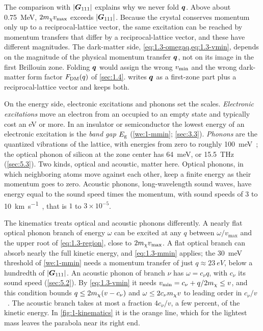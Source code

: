 The comparison with $|\bm{G}_{111}|$ explains why we never fold $\bm{q}$. Above about \SI{0.75}{MeV}, $2m_{\chi} v_{\mathrm{max}}$ exceeds $|\bm{G}_{111}|$. Because the crystal conserves momentum only up to a reciprocal-lattice vector, the same excitation can be reached by momentum transfers that differ by a reciprocal-lattice vector, and these have different magnitudes. The dark-matter side, \cref{eq:1.3-omegaq,eq:1.3-vmin}, depends on the magnitude of the physical momentum transfer $\bm{q}$, not on its image in the first Brillouin zone. Folding $\bm{q}$ would assign the wrong $v_{\mathrm{min}}$ and the wrong dark-matter form factor $F_{\mathrm{DM}}(q)$ of \cref{sec:1.4}.  writes $\bm{q}$ as a first-zone part plus a reciprocal-lattice vector and keeps both.

On the energy side, electronic excitations and phonons set the scales. \emph{Electronic excitations} move an electron from an occupied to an empty state and typically cost an eV or more. In an insulator or semiconductor the lowest energy of an electronic excitation is the \emph{band gap} $E_{\mathrm{g}}$ (\cref{we:1-mmin}; \cref{sec:3.3}). \emph{Phonons} are the quantized vibrations of the lattice, with energies from zero to roughly \SI{100}{meV}~\cite[Sect.~III\,A]{kahn2022searches}; the optical phonon of silicon at the zone center has \SI{64}{meV}, or \SI{15.5}{THz}~\cite{nilsson1972study} (\cref{sec:5.3}). Two kinds, optical and acoustic, matter here. Optical phonons, in which neighboring atoms move against each other, keep a finite energy as their momentum goes to zero. Acoustic phonons, long-wavelength sound waves, have energy equal to the sound speed times the momentum, with sound speeds of 3 to \SI{10}{km.s^{-1}}~\cite[Eq.~(50)]{kahn2022searches}, that is $1$ to $3\times10^{-5}$.

The kinematics treats optical and acoustic phonons differently. A nearly flat optical phonon branch of energy $\omega$ can be excited at any $q$ between $\omega/v_{\mathrm{max}}$ and the upper root of \cref{eq:1.3-region}, close to $2m_{\chi} v_{\mathrm{max}}$. A flat optical branch can absorb nearly the full kinetic energy, and \cref{eq:1.3-mmin} applies; the \SI{30}{meV} threshold of \cref{we:1-mmin} needs a momentum transfer of just $q \approx \SI{23}{eV}$, below a hundredth of $|\bm{G}_{111}|$. An acoustic phonon of branch $\nu$ has $\omega = c_\nu q$, with $c_\nu$ its sound speed (\cref{sec:5.2}). By \cref{eq:1.3-vmin} it needs $v_{\mathrm{min}} = c_\nu + q/2m_{\chi} \le v$, and this condition bounds $q \le 2m_{\chi}(v - c_\nu)$ and $\omega \le 2c_\nu m_{\chi} v$ to leading order in $c_\nu/v$~\cite[Eq.~(93)]{kahn2022searches}. The acoustic branch takes at most a fraction $4c_\nu/v$, a few percent, of the kinetic energy. In \cref{fig:1-kinematics} it is the orange line, which for the lightest mass leaves the parabola near its right end.

